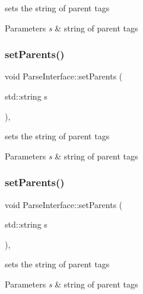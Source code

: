 sets the string of parent tags 
\begin{DoxyParams}{Parameters}
{\em s} & string of parent tags \\
\hline
\end{DoxyParams}
\mbox{\label{classParseInterface_a000ce4b52a192d2a7d0bfeaeb38fc358}} 
\subsubsection{\texorpdfstring{set\+Parents()}{setParents()}\hspace{0.1cm}{\footnotesize\ttfamily [2/3]}}
{\footnotesize\ttfamily void Parse\+Interface\+::set\+Parents (\begin{DoxyParamCaption}\item[{std\+::string}]{s }\end{DoxyParamCaption})\hspace{0.3cm}{\ttfamily [inline]}, {\ttfamily [protected]}}

sets the string of parent tags 
\begin{DoxyParams}{Parameters}
{\em s} & string of parent tags \\
\hline
\end{DoxyParams}
\mbox{\label{classParseInterface_a000ce4b52a192d2a7d0bfeaeb38fc358}} 
\subsubsection{\texorpdfstring{set\+Parents()}{setParents()}\hspace{0.1cm}{\footnotesize\ttfamily [3/3]}}
{\footnotesize\ttfamily void Parse\+Interface\+::set\+Parents (\begin{DoxyParamCaption}\item[{std\+::string}]{s }\end{DoxyParamCaption})\hspace{0.3cm}{\ttfamily [inline]}, {\ttfamily [protected]}}

sets the string of parent tags 
\begin{DoxyParams}{Parameters}
{\em s} & string of parent tags \\
\hline
\end{DoxyParams}
\mbox{\label{classParseInterface_af983d932c4a708ffeba59fe71b46c2dc}} 
